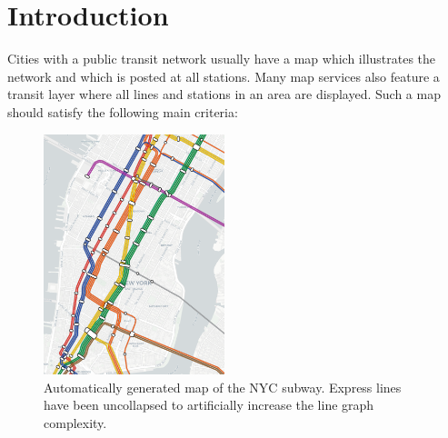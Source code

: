 \documentclass[sigconf]{acmart}
\begin{document}


\maketitle

\section{Introduction}\label{SEC:intro}
%

Cities with a public transit network usually have a map which illustrates the network and which is posted at all stations. Many map services also feature a transit layer where all lines and stations in an area are displayed.
Such a map should satisfy the following main criteria:\vspace{0pt}

\begin{figure}
\centering
\includegraphics[width=0.47\textwidth]{newyork.pdf}
\caption{Automatically generated map of the NYC subway. Express lines have been uncollapsed to artificially increase the line graph complexity.}
\end{figure}
\end{document}
